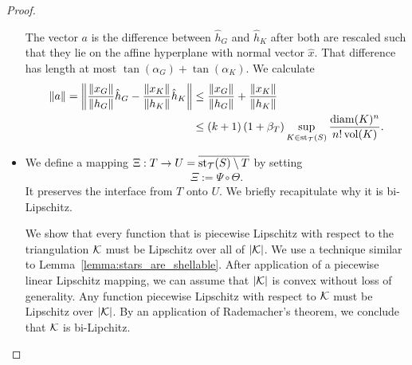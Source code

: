 \documentclass[10pt,letterpaper]{article}
\begin{document}
\begin{proof}
\begin{itemize}
        The vector $a$ is the difference between $\hat h_{G}$ and $\hat h_{K}$ after both are rescaled such that they lie on the affine hyperplane with normal vector $\hat x$. That difference has length at most $\tan(\alpha_{G}) + \tan(\alpha_{K})$.
        We calculate 
        \begin{align*}
            \|a\|
            = 
            \left\|
            \frac{\|x_{G}\|}{\|h_{G}\|} \hat h_{{G}} 
            - 
            \frac{\|x_{K}\|}{\|h_{K}\|} \hat h_K
            \right\|
            &
            \leq 
            \frac{\|x_{G}\|}{\|h_{G}\|} 
            + 
            \frac{\|x_{K}\|}{\|h_{K}\|} 
            \\&
            \leq 
            (k+1) 
            \left( 1 + \beta_T \right)
            \sup_{ K \in \operatorname{st}_{{\mathcal T}}(S) }
            \frac{ {\operatorname{diam}}(K)^{n} }{ n! \operatorname{vol}(K) }
            .
        \end{align*}
        
        \item 
        We define a mapping $ \Xi : T \rightarrow U = \overline{\operatorname{st}_{{\mathcal T}}(S) \setminus T}$ by setting 
        \begin{align*}
            \Xi := \Psi \circ \Theta.
        \end{align*}
        It preserves the interface from $T$ onto $U$. We briefly recapitulate why it is bi-Lipschitz.
        
        We show that every function that is piecewise Lipschitz with respect to the triangulation ${\mathcal K}$ must be Lipschitz over all of $|{\mathcal K}|$. 
        We use a technique similar to Lemma~\ref{lemma:stars_are_shellable}. 
        After application of a piecewise linear Lipschitz mapping, 
        we can assume that $|{\mathcal K}|$ is convex without loss of generality. 
        Any function piecewise Lipschitz with respect to ${\mathcal K}$ must be Lipschitz over $|{\mathcal K}|$. 
        By an application of Rademacher's theorem, we conclude that ${\mathcal K}$ is bi-Lipchitz. 
        

\end{itemize}
\end{proof}
\end{document}
